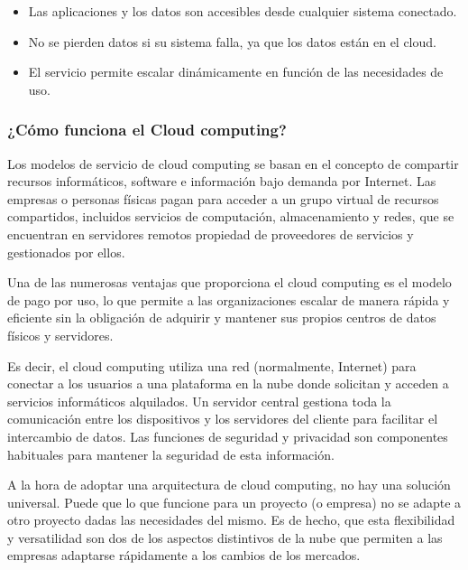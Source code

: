 \begin{itemize}
    \item Las aplicaciones y los datos son accesibles desde cualquier sistema conectado.
    \item No se pierden datos si su sistema falla, ya que los datos están en el cloud.
    \item El servicio permite escalar dinámicamente en función de las necesidades de uso.
\end{itemize}

\subsubsection{¿Cómo funciona el Cloud computing?}
Los modelos de servicio de cloud computing se basan en el concepto de compartir recursos informáticos, software e información bajo demanda por Internet. Las empresas o personas físicas pagan para acceder a un grupo virtual de recursos compartidos, incluidos servicios de computación, almacenamiento y redes, que se encuentran en servidores remotos propiedad de proveedores de servicios y gestionados por ellos. 

Una de las numerosas ventajas que proporciona el cloud computing es el modelo de pago por uso, lo que permite a las organizaciones escalar de manera rápida y eficiente sin la obligación de adquirir y mantener sus propios centros de datos físicos y servidores. 

Es decir, el cloud computing utiliza una red (normalmente, Internet) para conectar a los usuarios a una plataforma en la nube donde solicitan y acceden a servicios informáticos alquilados. Un servidor central gestiona toda la comunicación entre los dispositivos y los servidores del cliente para facilitar el intercambio de datos. Las funciones de seguridad y privacidad son componentes habituales para mantener la seguridad de esta información.  

A la hora de adoptar una arquitectura de cloud computing, no hay una solución universal. Puede que lo que funcione para un proyecto (o empresa) no se adapte a otro proyecto dadas las necesidades del mismo. Es de hecho, que esta flexibilidad y versatilidad son dos de los aspectos distintivos de la nube que permiten a las empresas adaptarse rápidamente a los cambios de los mercados.

